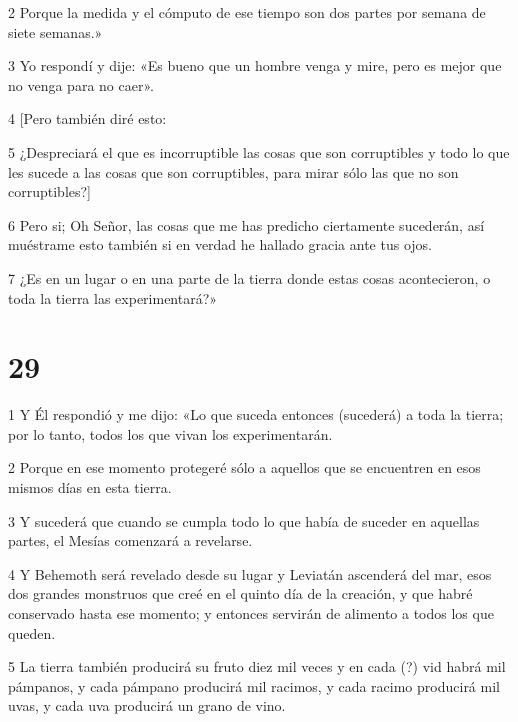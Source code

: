 \par 2 Porque la medida y el cómputo de ese tiempo son dos partes por semana de siete semanas.»

\par 3 Yo respondí y dije: «Es bueno que un hombre venga y mire, pero es mejor que no venga para no caer».

\par 4 [Pero también diré esto:

\par 5 ¿Despreciará el que es incorruptible las cosas que son corruptibles y todo lo que les sucede a las cosas que son corruptibles, para mirar sólo las que no son corruptibles?]

\par 6 Pero si; Oh Señor, las cosas que me has predicho ciertamente sucederán, así muéstrame esto también si en verdad he hallado gracia ante tus ojos.

\par 7 ¿Es en un lugar o en una parte de la tierra donde estas cosas acontecieron, o toda la tierra las experimentará?»

\chapter{29}

\par 1 Y Él respondió y me dijo: «Lo que suceda entonces (sucederá) a toda la tierra; por lo tanto, todos los que vivan los experimentarán.

\par 2 Porque en ese momento protegeré sólo a aquellos que se encuentren en esos mismos días en esta tierra.

\par 3 Y sucederá que cuando se cumpla todo lo que había de suceder en aquellas partes, el Mesías comenzará a revelarse.

\par 4 Y Behemoth será revelado desde su lugar y Leviatán ascenderá del mar, esos dos grandes monstruos que creé en el quinto día de la creación, y que habré conservado hasta ese momento; y entonces servirán de alimento a todos los que queden.

\par 5 La tierra también producirá su fruto diez mil veces y en cada (?) vid habrá mil pámpanos, y cada pámpano producirá mil racimos, y cada racimo producirá mil uvas, y cada uva producirá un grano de vino.

